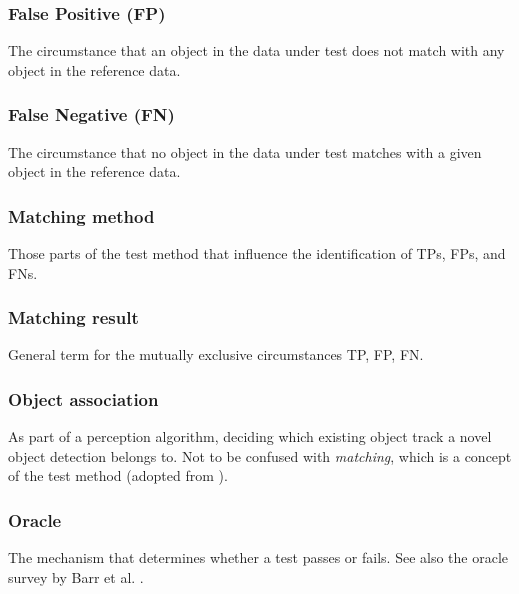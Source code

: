 \documentclass[conference]{IEEEtran}
\begin{document}
\subsubsection{False Positive (FP)} \label{def:fp} The circumstance that an object in the data under test does not match with any object in the reference data. 

\subsubsection{False Negative (FN)} \label{def:fn} The circumstance that no object in the data under test matches with a given object in the reference data.

\subsubsection{Matching method} \label{def:matching_method} Those parts of the test method that influence the identification of TPs, FPs, and FNs. %


\subsubsection{Matching result} \label{def:matching_result} General term for the mutually exclusive circumstances TP, FP, FN.  



\subsubsection{Object association} \label{def:association} As part of a perception algorithm, deciding which existing object track a novel object detection belongs to. Not to be confused with \textit{matching}, which is a concept of the test method (adopted from \cite{Luiten2020hota}).

\subsubsection{Oracle} \label{def:oracle} The mechanism that determines whether a test passes or fails. See also the oracle survey by Barr et al. \cite{Barr2015oracle}.
\end{document}
